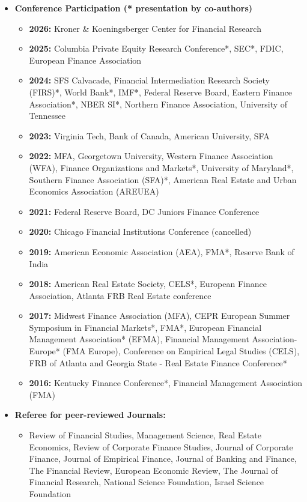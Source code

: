 \documentclass{article}[12]
\begin{document}
\begin{itemize}[itemsep=0.5em]
    \item \textbf{Conference Participation (* presentation by co-authors)}
    \begin{itemize}
        \item \textbf{2026:} Kroner \& Koeningsberger Center for Financial Research
        \item \textbf{2025:} Columbia Private Equity Research Conference*, SEC*, FDIC, European Finance Association
        \item \textbf{2024:} SFS Calvacade, Financial Intermediation Research Society (FIRS)*, World Bank*, IMF*, Federal Reserve Board, Eastern Finance Association*, NBER SI*, Northern Finance Association, University of Tennessee
        \item \textbf{2023:} Virginia Tech, Bank of Canada, American University, SFA
        \item \textbf{2022:} MFA, Georgetown University, Western Finance Association (WFA), Finance Organizations and Markets*, University of Maryland*, Southern Finance Association (SFA)*, American Real Estate and Urban Economics Association (AREUEA)
        \item \textbf{2021:} Federal Reserve Board, DC Juniors Finance Conference
        \item \textbf{2020:} Chicago Financial Institutions Conference (cancelled)
        \item \textbf{2019:} American Economic Association (AEA), FMA*, Reserve Bank of India
        \item \textbf{2018:} American Real Estate Society, CELS*, European Finance Association, Atlanta FRB Real Estate conference
        \item \textbf{2017:} Midwest Finance Association (MFA), CEPR European Summer Symposium in Financial Markets*, FMA*, European Financial Management Association* (EFMA), Financial Management Association-Europe* (FMA Europe), Conference on Empirical Legal Studies (CELS), FRB of Atlanta and Georgia State - Real Estate Finance Conference*
        \item \textbf{2016:} Kentucky Finance Conference*, Financial Management Association (FMA)
    \end{itemize}

    \item \textbf{Referee for peer-reviewed Journals:}
    \begin{itemize}[itemsep=0.005em]
        \item Review of Financial Studies, Management Science, Real Estate Economics, Review of Corporate Finance Studies, Journal of Corporate Finance, Journal of Empirical Finance, Journal of Banking and Finance, The Financial Review, European Economic Review, The Journal of Financial Research, National Science Foundation, Israel Science Foundation
    \end{itemize}
\end{itemize}
\end{document}
